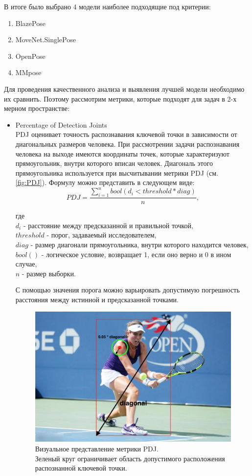 В итоге было выбрано 4 модели наиболее подходящие под критерии:
\begin{enumerate}
	\item BlazePose
	\item MoveNet.SinglePose
	\item OpenPose
	\item MMpose
\end{enumerate}

Для проведения качественного анализа и выявления лучшей модели необходимо их сравнить. Поэтому рассмотрим метрики, которые подходят для задач в 2-х мерном пространстве:

\begin{itemize}
	\item Percentage of Detection Joints\\
	PDJ оценивает точность распознавания ключевой точки в зависимости от диагональных размеров человека. При рассмотрении задачи распознавания человека на выходе имеются координаты точек, которые характеризуют прямоугольник, внутри которого вписан человек. Диагональ этого прямоугольника используется при высчитывании метрики PDJ (см. \autoref{fig:PDJ}). Формулу можно представить в следующем виде:
	\begin{equation}
		PDJ = \frac{\sum_{i=1}^{n} bool(d_i < threshold * diag)}{n},
	\end{equation}
	
	где\\
	$d_i$ - расстояние между предсказанной и правильной точкой,\\
	$threshold$ - порог, задаваемый исследователем,\\
	$diag$ - размер диагонали прямоугольника, внутри которого находится человек,\\
	$bool()$ - логическое условие, возвращает 1, если оно верно и 0 в ином случае,\\
	$n$ - размер выборки.
	
	С помощью значения порога можно варьировать допустимую погрешность расстояния между истинной и предсказанной точками.
	\begin{figure}[h]
		\centering
		\includegraphics[width=\textwidth * 4 / 5]{./images/PDJ}
		\caption{Визуальное представление метрики PDJ.\\ Зеленый круг ограничивает область допустимого расположения распознанной ключевой точки.}
		\label{fig:PDJ}
	\end{figure}


\end{itemize}
